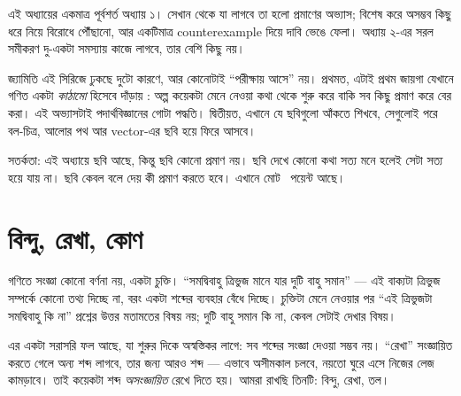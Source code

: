 \documentclass[11pt]{article}
\begin{document}

\noindent
এই অধ্যায়ের একমাত্র পূর্বশর্ত অধ্যায় ১। সেখান থেকে যা লাগবে তা হলো
প্রমাণের অভ্যাস; বিশেষ করে অসম্ভব কিছু ধরে নিয়ে বিরোধে পৌঁছানো, আর একটিমাত্র
counterexample দিয়ে দাবি ভেঙে ফেলা। অধ্যায় ২-এর সরল সমীকরণ দু-একটা সমস্যায়
কাজে লাগবে, তার বেশি কিছু নয়।

জ্যামিতি এই সিরিজে ঢুকছে দুটো কারণে, আর কোনোটাই ``পরীক্ষায় আসে'' নয়। প্রথমত,
এটাই প্রথম জায়গা যেখানে গণিত একটা \emph{কাঠামো} হিসেবে দাঁড়ায় : অল্প কয়েকটা
মেনে নেওয়া কথা থেকে শুরু করে বাকি সব কিছু প্রমাণ করে বের করা। এই অভ্যাসটাই
পদার্থবিজ্ঞানের গোটা পদ্ধতি। দ্বিতীয়ত, এখানে যে ছবিগুলো আঁকতে শিখবে, সেগুলোই
পরে বল-চিত্র, আলোর পথ আর vector-এর ছবি হয়ে ফিরে আসবে।

সতর্কতা: এই অধ্যায়ে ছবি আছে, কিন্তু ছবি কোনো প্রমাণ নয়। ছবি দেখে কোনো কথা
সত্য মনে হলেই সেটা সত্য হয়ে যায় না। ছবি কেবল বলে দেয় কী প্রমাণ করতে হবে।
এখানে মোট \totalpoints\ পয়েন্ট আছে।

\section{বিন্দু, রেখা, কোণ}

\begin{idea}[সংজ্ঞা একটা চুক্তি]
গণিতে সংজ্ঞা কোনো বর্ণনা নয়, একটা চুক্তি। ``সমদ্বিবাহু ত্রিভুজ মানে যার দুটি
বাহু সমান'' --- এই বাক্যটা ত্রিভুজ সম্পর্কে কোনো তথ্য দিচ্ছে না, বরং একটা শব্দের
ব্যবহার বেঁধে দিচ্ছে। চুক্তিটা মেনে নেওয়ার পর ``এই ত্রিভুজটা সমদ্বিবাহু কি না''
প্রশ্নের উত্তর মতামতের বিষয় নয়; দুটি বাহু সমান কি না, কেবল সেটাই দেখার বিষয়।

এর একটা সরাসরি ফল আছে, যা শুরুর দিকে অস্বস্তিকর লাগে: সব শব্দের সংজ্ঞা দেওয়া
সম্ভব নয়। ``রেখা'' সংজ্ঞায়িত করতে গেলে অন্য শব্দ লাগবে, তার জন্য আরও শব্দ ---
এভাবে অসীমকাল চলবে, নয়তো ঘুরে এসে নিজের লেজ কামড়াবে। তাই কয়েকটা শব্দ
\emph{অসংজ্ঞায়িত} রেখে দিতে হয়। আমরা রাখছি তিনটি: বিন্দু, রেখা, তল।
\end{idea}
\end{document}
